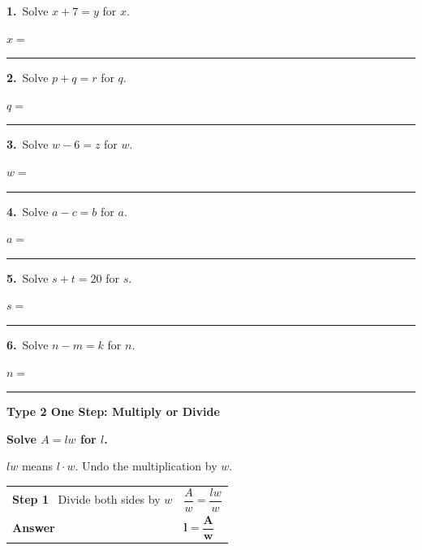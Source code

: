 \documentclass[11pt,letterpaper]{article}
\newcommand{\topicbar}[1]{\needspace{4.5cm}\par\vspace{5mm}
  \begin{tcolorbox}[enhanced,colback=fmtitle,colframe=fmtitle,arc=2mm,left=4mm,top=1.5mm,bottom=1.5mm]
  \color{white}\bfseries\large #1
  \end{tcolorbox}}
\begin{document}
\needspace{3.5cm}\par\vspace{3mm}\noindent \begin{minipage}[t][3.0cm]{0.48\linewidth}\raggedright{\color{fmturn}\bfseries 1.}\ Solve $x + 7 = y$ for $x$.\par\vfill\hfill $x = $\ \rule{3.2cm}{0.4pt}\end{minipage}\hfill \begin{minipage}[t][3.0cm]{0.48\linewidth}\raggedright{\color{fmturn}\bfseries 2.}\ Solve $p + q = r$ for $q$.\par\vfill\hfill $q = $\ \rule{3.2cm}{0.4pt}\end{minipage}\par
\needspace{3.5cm}\par\vspace{3mm}\noindent \begin{minipage}[t][3.0cm]{0.48\linewidth}\raggedright{\color{fmturn}\bfseries 3.}\ Solve $w - 6 = z$ for $w$.\par\vfill\hfill $w = $\ \rule{3.2cm}{0.4pt}\end{minipage}\hfill \begin{minipage}[t][3.0cm]{0.48\linewidth}\raggedright{\color{fmturn}\bfseries 4.}\ Solve $a - c = b$ for $a$.\par\vfill\hfill $a = $\ \rule{3.2cm}{0.4pt}\end{minipage}\par
\needspace{3.5cm}\par\vspace{3mm}\noindent \begin{minipage}[t][3.0cm]{0.48\linewidth}\raggedright{\color{fmturn}\bfseries 5.}\ Solve $s + t = 20$ for $s$.\par\vfill\hfill $s = $\ \rule{3.2cm}{0.4pt}\end{minipage}\hfill \begin{minipage}[t][3.0cm]{0.48\linewidth}\raggedright{\color{fmturn}\bfseries 6.}\ Solve $n - m = k$ for $n$.\par\vfill\hfill $n = $\ \rule{3.2cm}{0.4pt}\end{minipage}\par
\needspace{9cm}\topicbar{Type 2 \quad One Step: Multiply or Divide}
\begin{watchme}\textbf{Solve $A = lw$ for $l$.}\par\vspace{1mm}
$lw$ means $l \cdot w$. Undo the multiplication by $w$.\par\vspace{1mm}
\renewcommand{\arraystretch}{2.1}\begin{tabular}{@{}l l@{}}
\textbf{Step 1} \ Divide both sides by $w$ & $\dfrac{A}{w} = \dfrac{lw}{w}$\\
\textbf{Answer} & $\boldsymbol{l = \dfrac{A}{w}}$
\end{tabular}\end{watchme}
\end{document}
